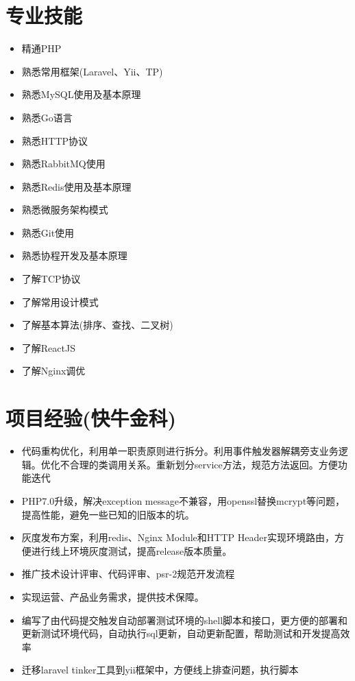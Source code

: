 \documentclass[a4paper,12pt]{article}
\begin{document}
\begin{CJK}{UTF8}{gbsn}
		\section{专业技能}
			\begin{itemize}
				\item{精通PHP}
				\item{熟悉常用框架(Laravel、Yii、TP)}
				\item{熟悉MySQL使用及基本原理}
				\item{熟悉Go语言}
				\item{熟悉HTTP协议}
				\item{熟悉RabbitMQ使用}
				\item{熟悉Redis使用及基本原理}
				\item{熟悉微服务架构模式}
				\item{熟悉Git使用}
				\item{熟悉协程开发及基本原理}
				\item{了解TCP协议}
				\item{了解常用设计模式}
				\item{了解基本算法(排序、查找、二叉树)}
				\item{了解ReactJS}
				\item{了解Nginx调优}
			\end{itemize}
		
		\section{项目经验(快牛金科)}
			\begin{itemize}
				\item{代码重构优化，利用单一职责原则进行拆分。利用事件触发器解耦旁支业务逻辑。优化不合理的类调用关系。重新划分service方法，规范方法返回。方便功能迭代}
				\item{PHP7.0升级，解决exception message不兼容，用openssl替换mcrypt等问题，提高性能，避免一些已知的旧版本的坑。}
				\item{灰度发布方案，利用redis、Nginx Module和HTTP Header实现环境路由，方便进行线上环境灰度测试，提高release版本质量。}
				\item{推广技术设计评审、代码评审、psr-2规范开发流程}
				\item{实现运营、产品业务需求，提供技术保障。}
				\item{编写了由代码提交触发自动部署测试环境的shell脚本和接口，更方便的部署和更新测试环境代码，自动执行sql更新，自动更新配置，帮助测试和开发提高效率}
				\item{迁移laravel tinker工具到yii框架中，方便线上排查问题，执行脚本}
			\end{itemize}
			

\end{CJK}
\end{document}
